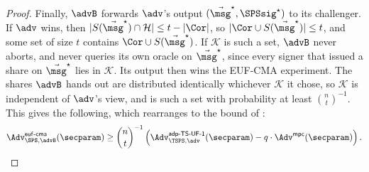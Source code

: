 \begin{proof}
  Finally, $\advB$ forwards $\adv$'s output $(\vec{\msg}^\star,
\SPSsig^\star)$ to its challenger. If $\adv$ wins, then $|S(\vec{\msg}^\star) \cap
\mathcal{H}| \leq t - |\Cor|$, so $|\Cor \cup S(\vec{\msg}^\star)| \leq t$, and some
set of size $t$ contains $\Cor \cup S(\vec{\msg}^\star)$. If $\mathcal{K}$ is such a
set, $\advB$ never aborts, and never queries its own oracle on $\vec{\msg}^\star$,
since every signer that issued a share on $\vec{\msg}^\star$ lies in $\mathcal{K}$.
Its output then wins the EUF-CMA experiment. The shares $\advB$ hands out are
distributed identically whichever $\mathcal{K}$ it chose, so $\mathcal{K}$ is
independent of $\adv$'s view, and is such a set with probability at least
$\binom{n}{t}^{-1}$. This gives the following, which rearranges to the bound
of :
  \begin{equation*}
    \Adv^{\mathsf{euf\text{-}cma}}_{\SPS,\advB}(\secparam) \geq
\binom{n}{t}^{-1} \left(\Adv^{\mathsf{adp\text{-}TS\text{-}UF\text{-}1}}_{\TSPS,\adv}(\secparam)
- q \cdot \Adv^{\mathsf{mpc}}(\secparam)\right).
  \end{equation*}
\end{proof}
